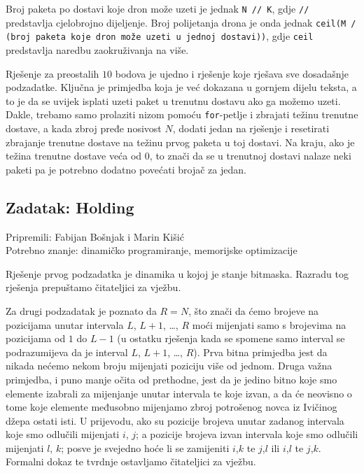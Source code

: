 \documentclass[a4paper]{article}
\begin{document}
Broj paketa po dostavi koje dron može uzeti je jednak \texttt{N // K}, gdje
\texttt{//} predstavlja cjelobrojno dijeljenje. Broj polijetanja drona je onda
jednak \texttt{ceil(M / (broj paketa koje dron može uzeti u jednoj dostavi))},
gdje \texttt{ceil} predstavlja naredbu zaokruživanja na više.

Rješenje za preostalih $10$ bodova je ujedno i rješenje koje rješava sve
dosadašnje podzadatke. Ključna je primjedba koja je već dokazana u gornjem
dijelu teksta, a to je da se uvijek isplati uzeti paket u trenutnu dostavu ako
ga možemo uzeti. Dakle, trebamo samo prolaziti nizom pomoću \texttt{for}-petlje
i zbrajati težinu trenutne dostave, a kada zbroj pređe nosivost $N$, dodati
jedan na rješenje i resetirati zbrajanje trenutne dostave na težinu prvog
paketa u toj dostavi. Na kraju, ako je težina trenutne dostave veća od $0$, to
znači da se u trenutnoj dostavi nalaze neki paketi pa je potrebno dodatno
povećati brojač za jedan.


\subsection*{Zadatak: Holding}
\textsf{Pripremili: Fabijan Bošnjak i Marin Kišić}\\
\textsf{Potrebno znanje: dinamičko programiranje, memorijske optimizacije}

Rješenje prvog podzadatka je dinamika u kojoj je stanje bitmaska. Razradu tog
rješenja prepuštamo čitateljici za vježbu.

Za drugi podzadatak je poznato da $R = N$, što znači da ćemo brojeve na pozicijama
unutar intervala $L$, $L+1$, \dots, $R$ moći mijenjati samo s brojevima na pozicijama od
$1$ do $L-1$ (u ostatku rješenja kada se spomene samo interval se podrazumijeva da
je interval $L$, $L+1$, \dots, $R$). Prva bitna primjedba jest da nikada nećemo nekom
broju mijenjati poziciju više od jednom. Druga važna primjedba, i puno
manje očita od prethodne, jest da je jedino bitno koje smo elemente izabrali za
mijenjanje unutar intervala te koje izvan, a da će neovisno o tome koje
elemente međusobno mijenjamo zbroj potrošenog novca iz Ivičinog džepa ostati
isti. U prijevodu, ako su pozicije brojeva unutar zadanog intervala koje smo
odlučili mijenjati $i$, $j$; a pozicije brojeva izvan intervala koje smo odlučili
mijenjati $l$, $k$; posve je svejedno hoće li se zamijeniti $i$,$k$ te $j$,$l$ ili $i$,$l$ te
$j$,$k$. Formalni dokaz te tvrdnje ostavljamo čitateljici za vježbu.
\end{document}
